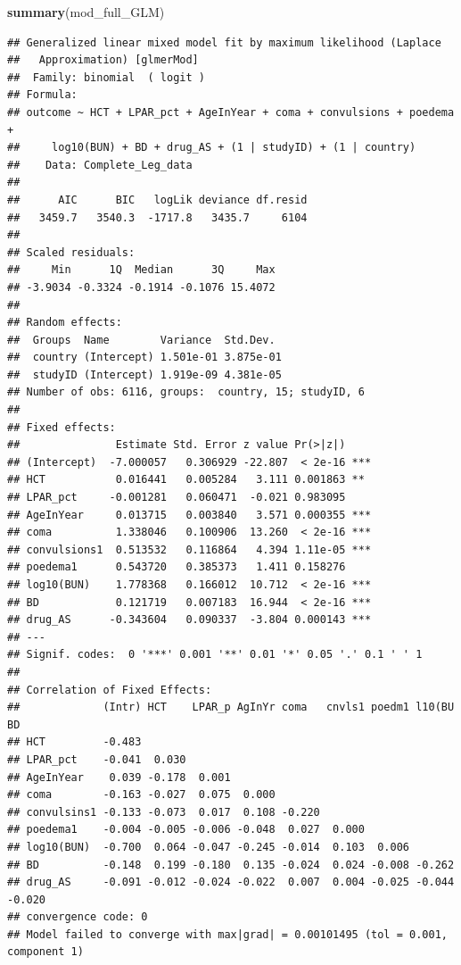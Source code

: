 \documentclass[]{article}
\newenvironment{Shaded}{\begin{snugshade}}{\end{snugshade}}
\newcommand{\KeywordTok}[1]{\textcolor[rgb]{0.13,0.29,0.53}{\textbf{#1}}}
\newcommand{\NormalTok}[1]{#1}
\begin{document}
\begin{Shaded}
\begin{Highlighting}[]
\KeywordTok{summary}\NormalTok{(mod_full_GLM)}
\end{Highlighting}
\end{Shaded}

\begin{verbatim}
## Generalized linear mixed model fit by maximum likelihood (Laplace
##   Approximation) [glmerMod]
##  Family: binomial  ( logit )
## Formula: 
## outcome ~ HCT + LPAR_pct + AgeInYear + coma + convulsions + poedema +  
##     log10(BUN) + BD + drug_AS + (1 | studyID) + (1 | country)
##    Data: Complete_Leg_data
## 
##      AIC      BIC   logLik deviance df.resid 
##   3459.7   3540.3  -1717.8   3435.7     6104 
## 
## Scaled residuals: 
##     Min      1Q  Median      3Q     Max 
## -3.9034 -0.3324 -0.1914 -0.1076 15.4072 
## 
## Random effects:
##  Groups  Name        Variance  Std.Dev. 
##  country (Intercept) 1.501e-01 3.875e-01
##  studyID (Intercept) 1.919e-09 4.381e-05
## Number of obs: 6116, groups:  country, 15; studyID, 6
## 
## Fixed effects:
##               Estimate Std. Error z value Pr(>|z|)    
## (Intercept)  -7.000057   0.306929 -22.807  < 2e-16 ***
## HCT           0.016441   0.005284   3.111 0.001863 ** 
## LPAR_pct     -0.001281   0.060471  -0.021 0.983095    
## AgeInYear     0.013715   0.003840   3.571 0.000355 ***
## coma          1.338046   0.100906  13.260  < 2e-16 ***
## convulsions1  0.513532   0.116864   4.394 1.11e-05 ***
## poedema1      0.543720   0.385373   1.411 0.158276    
## log10(BUN)    1.778368   0.166012  10.712  < 2e-16 ***
## BD            0.121719   0.007183  16.944  < 2e-16 ***
## drug_AS      -0.343604   0.090337  -3.804 0.000143 ***
## ---
## Signif. codes:  0 '***' 0.001 '**' 0.01 '*' 0.05 '.' 0.1 ' ' 1
## 
## Correlation of Fixed Effects:
##             (Intr) HCT    LPAR_p AgInYr coma   cnvls1 poedm1 l10(BU BD    
## HCT         -0.483                                                        
## LPAR_pct    -0.041  0.030                                                 
## AgeInYear    0.039 -0.178  0.001                                          
## coma        -0.163 -0.027  0.075  0.000                                   
## convulsins1 -0.133 -0.073  0.017  0.108 -0.220                            
## poedema1    -0.004 -0.005 -0.006 -0.048  0.027  0.000                     
## log10(BUN)  -0.700  0.064 -0.047 -0.245 -0.014  0.103  0.006              
## BD          -0.148  0.199 -0.180  0.135 -0.024  0.024 -0.008 -0.262       
## drug_AS     -0.091 -0.012 -0.024 -0.022  0.007  0.004 -0.025 -0.044 -0.020
## convergence code: 0
## Model failed to converge with max|grad| = 0.00101495 (tol = 0.001, component 1)
\end{verbatim}
\end{document}
